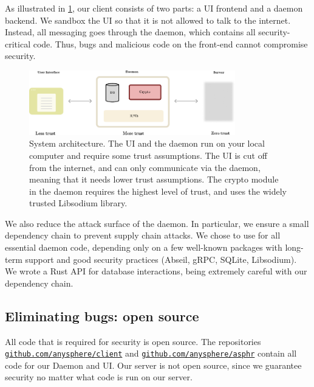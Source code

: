 As illustrated in \cref{fig:systemdiagram}, our client consists of two parts: a UI frontend and a daemon backend. We sandbox the UI so that it is not allowed to talk to the internet. Instead, all messaging goes through the daemon, which contains all security-critical code. Thus, bugs and malicious code on the front-end cannot compromise security.
\begin{figure}
    \centering
    \includegraphics[width=0.8\textwidth]{systemdiagram.pdf}
\caption{System architecture. The UI and the daemon run on your local computer and require some trust assumptions. The UI is cut off from the internet, and can only communicate via the daemon, meaning that it needs lower trust assumptions. The crypto module in the daemon requires the highest level of trust, and uses the widely trusted Libsodium library.}
\label{fig:systemdiagram}
\end{figure}

We also reduce the attack surface of the daemon. In particular, we ensure a small dependency chain to prevent supply chain attacks. We chose to use \Cpp for all essential daemon code, depending only on a few well-known packages with long-term support and good security practices (Abseil, gRPC, SQLite, Libsodium). We wrote a Rust API for database interactions, being extremely careful with our dependency chain. 


\subsection{Eliminating bugs: open source}

All code that is required for security is open source. The repositories \\ {\tt \href{https://github.com/anysphere/client}{github.com/anysphere/client}} and  {\tt \href{https://github.com/anysphere/asphr}{github.com/anysphere/asphr}} contain all code for our Daemon and UI. Our server is not open source, since we guarantee security no matter what code is run on our server. 

